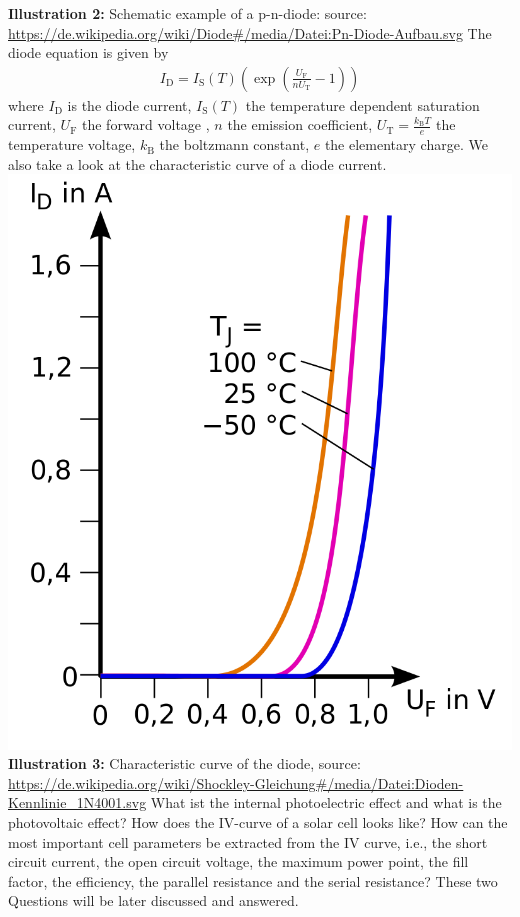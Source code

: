 \documentclass[a4paper, 12pt]{scrartcl}
\begin{document}
\newline 
\textbf{Illustration 2:} Schematic example of a p-n-diode: source: \url{https://de.wikipedia.org/wiki/Diode#/media/Datei:Pn-Diode-Aufbau.svg}
\newline 
The diode equation is given by 
\begin{align}
I_\textrm{D} = I_\textrm{S}(T) \left( \exp \left( \frac{ U_\textrm{F}}{n U_\textrm{T}} -1 \right) \right) 
\end{align}
where $I_\textrm{D}$ is the diode current, $I_\textrm{S}(T)$ the temperature dependent saturation current, $U_\textrm{F}$ the forward voltage , $n$ the emission coefficient, $U_\textrm{T} = \frac{k_\textrm{B} T}{e}$ the temperature voltage, $k_\textrm{B}$ the boltzmann constant, $e$ the elementary charge. We also take a look at the characteristic curve of a diode current. 
\newline 
\hspace*{+4cm}
\includegraphics[scale=0.2]{szpic3}
\newline 
\textbf{Illustration 3:} Characteristic curve of the diode, source: \url{https://de.wikipedia.org/wiki/Shockley-Gleichung#/media/Datei:Dioden-Kennlinie_1N4001.svg}
\newline 
\newline 
What ist the internal photoelectric effect and what is the photovoltaic effect? 
\newline 
\newline How does the IV-curve of a solar cell looks like? How can the most important cell parameters be extracted from the IV curve, i.e., the short circuit current, the open circuit
voltage, the maximum power point, the fill factor, the efficiency, the parallel resistance
and the serial resistance?
\newline 
\newline 
These two Questions will be later discussed and answered. 
\end{document}
